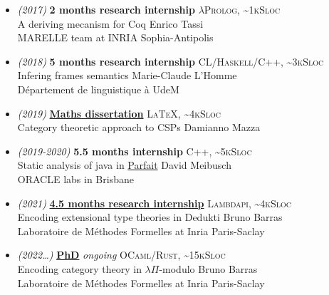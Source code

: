\documentclass[a4paper,11pt]{extarticle}
\newcommand{\lang}[2]{\hfill \textsc{\scriptsize #1, \textasciitilde#2Sloc}}
\newcommand{\director}[1]{\hfill {\scriptsize #1}}
\begin{document}
\begin{minipage}[c][282mm][t]{0.60\linewidth}
{        \begin{itemize}
          \itemsep0em
          \item \emph{\small (2017)} \textbf{2 months research internship}
                \lang{$\lambda$Prolog}{1k}\\
                A deriving mecanism for Coq
                \director{Enrico Tassi} \\
                MARELLE team at INRIA Sophia-Antipolis
          \item \emph{\small (2018)} \textbf{5 months research internship}
                \lang{CL/Haskell/C++}{3k}\\
                Infering frames semantics
                \director{Marie-Claude L'Homme}\\
                Département de linguistique à UdeM
          \item \emph{\small (2019)} \textbf{\href{https://github.com/dwarfmaster/memoire-dma-l3}{Maths dissertation}}
                \lang{\LaTeX}{4k}\\
                Category theoretic approach to CSPs
                \director{Damianno Mazza}
          \item \emph{\small (2019-2020)} \textbf{5.5 months internship}
                \lang{C++}{5k}\\
                Static analysis of java in \href{https://labs.oracle.com/pls/apex/f?p=LABS:project_details:0:13}{Parfait}
                \director{David Meibusch}\\
                ORACLE labs in Brisbane
          \item \emph{\small (2021)} \textbf{\href{https://github.com/dwarfmaster/ett-in-lambdapi}{4.5 months research internship}}
                \lang{Lambdapi}{4k}\\
                Encoding extensional type theories in Dedukti
                \director{Bruno Barras} \\
                Laboratoire de Méthodes Formelles at Inria Paris-Saclay
          \item \emph{\small (2022\dots)} \textbf{\href{https://github.com/dwarfmaster/commutative-diagrams}{PhD}} \emph{ongoing}
                \lang{OCaml/Rust}{15k} \\
                Encoding category theory in $\lambda\Pi$-modulo
                \director{Bruno Barras} \\
                Laboratoire de Méthodes Formelles at Inria Paris-Saclay
        \end{itemize}

}
\end{minipage}
\end{document}
